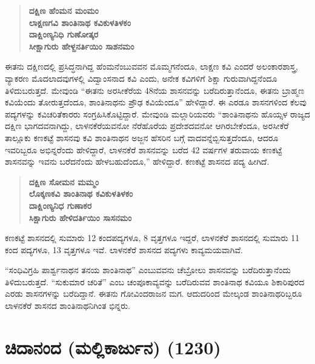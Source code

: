 \begin{verse}
\textbf{ದಕ್ಷಿಣ ಹೆಂಮನ ಮಂಮಂ } \\\textbf{ಲಾಕ್ಷಣಗವಿ ಶಾಂತಿನಾಥ ಕವಿಕುಳತಿಳಕಂ} \\\textbf{ದಾಕ್ಷಿಂಣ್ಯನಿಧಿ ಗುಣೋತ್ಕರ } \\\textbf{ಸೀಕ್ಷಾಗುರು ಹೇಳ್ದನರ್ತಿಯಿಂ ಸಾಶನಮಂ}
\end{verse}

ಈತನು ದಕ್ಷಿಣದಲ್ಲಿ ಪ್ರಸಿದ್ಧನಾಗಿದ್ದ ಹೆಂಮನೆಂಬುವವನ ಮೊಮ್ಮಗನೆಂದೂ, ಲಾಕ್ಷಣ ಕವಿ ಎಂದರೆ ಅಲಂಕಾರಶಾಸ್ತ್ರ, ವ್ಯಾಕರಣ ಮೊದಲಾದವುಗಳಲ್ಲಿ ವಿದ್ವಾಂಸನಾದ ಕವಿ ಎಂದು, ಅನೇಕ ಕವಿಗಳಿಗೆ ಶಿಕ್ಷಾ ಗುರುವಾಗಿದ್ದನೆಂದೂ ತಿಳಿದುಬರುತ್ತದೆ. ಮೇವುಂಡಿ “ಈತನು ಅರಸೀಕೆರೆಯ 48ನೆಯ ಶಾಸನವನ್ನು ಬರೆದಿರುತ್ತಾನೆಂದೂ, ಈತನು ಬ್ರಾಹ್ಮಣ ಕವಿಯೆಂದು ತೋರುತ್ತ\-ದೆಂದೂ, ಶಾಂತಿನಾಥನು ಪ್ರೌಢ ಕವಿಯೆಂದೂ” ಹೇಳಿದ್ದಾರೆ. ಈ ಎರಡೂ ಶಾಸನಗಳಿಂದ ಕೆಲವು ಪದ್ಯಗಳನ್ನು ಕವಿಚರಿತೆಕಾರರು ಸಂಗ್ರಹಿಸಿಕೊಟ್ಟಿದ್ದಾರೆ. ಮೇವುಂಡಿ ಮಲ್ಲಾರಿಯವರು “ಶಾಂತಿನಾಥನು ಹೊಯ್ಸಳ ರಾಜ್ಯದ ದಕ್ಷಿಣ ಭಾಗದವನಾಗಿದ್ದು, ಲಾಳನಕೆರೆಯವನೋ ನೆರೆಹೊರೆಯ ಪ್ರದೇಶದವನೋ ಆಗಿರಬೇಕೆಂದೂ, ಅರಸೀಕೆರೆ ತಾಲ್ಲೂಕು ಕಣಕಟ್ಟೆ ಶಾಸನವು ಕವಿ ಶಾಂತಿನಾಥನ ಅಜ್ಜನ ಹೆಸರಿನ ಬಗ್ಗೆ ವಾದವನ್ನೆಬ್ಬಿಸುತ್ತದೆಂದೂ, ಆದರೂ ಇವರಿಬ್ಬರೂ ಅಭಿನ್ನರೆಂದು ಹೇಳಿದ್ದಾರೆ, ಲಾಳನಕೆರೆ ಶಾಸನವನ್ನು ಬರೆದ 42 ವರ್ಷಗಳ ತರುವಾಯ ಕಣಕಟ್ಟೆ ಶಾಸನವನ್ನು ಇವನು ಬರೆದನೆಂದು ಹೇಳಬಹುದೆಂದೂ,” ಹೇಳಿದ್ದಾರೆ. ಕಣಕಟ್ಟೆ ಶಾಸನದ ಪದ್ಯ ಹೀಗಿದೆ.

\begin{verse}
\textbf{ದಕ್ಷಿಣ ಸೋಮನ ಮಮ್ಮಂ} \\\textbf{ಲೊಕ್ಕಣಕವಿ ಶಾಂತಿನಾಥ ಕವಿಕುಳತಿಳಕಂ} \\\textbf{ದಾಕ್ಷಿಂಣ್ಯನಿಧ ಗುಣಾಕರ} \\\textbf{ಸಿಕ್ಷಾಗುರು ಹೇಳಿದರ್ತಿಯಿಂ ಸಾಸನಮಂ}
\end{verse}

ಕಣಕಟ್ಟೆ ಶಾಸನದಲ್ಲಿ ಸುಮಾರು 12 ಕಂದಪದ್ಯಗಳೂ, 8 ವೃತ್ತಗಳೂ ಇದ್ದರೆ, ಲಾಳನಕೆರೆ ಶಾಸನದಲ್ಲಿ ಸುಮಾರು 11 ಕಂದ ಪದ್ಯಗಳೂ, 13 ವೃತ್ತಗಳೂ ಇವೆ. ಲಾಳನಕೆರೆ ಶಾಸನದ ಪದ್ಯಗಳು ಕಾವ್ಯಮಯವಾಗಿವೆ.

“ಸಂಧಿವಿಗ್ರಹಿ ಪಾರ್ಶ್ವನಾಥನ ತನಯ ಶಾಂತಿನಾಥ” ಎಂಬುವವನು ಚೆಬ್ರೋಲು ಶಾಸನವನ್ನು ಬರೆದಿರುತ್ತಾನೆಂದು ತಿಳಿದುಬರುತ್ತದೆ. “ಸುಕುಮಾರ ಚರಿತೆ” ಎಂಬ ಚಂಪೂಕಾವ್ಯವನ್ನು ಬರೆದಿರುವವ ಶಾಂತಿನಾಥ ಕವಿಯೂ ಶಿಕಾರಿಪುರದ ಎರಡು ಶಾಸನಗಳನ್ನು ಬರೆದಿದ್ದಾನೆ. ಈತನು ಗೋವಿಂದರಾಜನ ಮಗ. ಆದುದರಿಂದ ಮೇಲ್ಕಂಡ ಶಾಂತಿನಾಥರಿಬ್ಬರೂ ಲಾಳನಕೆರೆ ಶಾಸನದ ಶಾಂತಿನಾಥನಿಗಿಂತ ಭಿನ್ನರು.


\section{ಚಿದಾನಂದ (ಮಲ್ಲಿಕಾರ್ಜುನ) (1230)}

